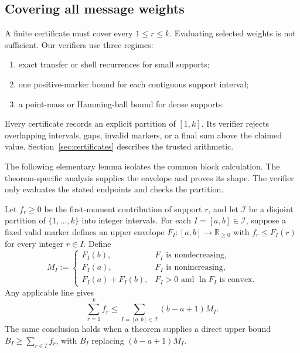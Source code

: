\subsection{Covering all message weights}

A finite certificate must cover every $1\leq r\leq k$.  Evaluating selected
weights is not sufficient.  Our verifiers use three regimes:

\begin{enumerate}
  \item exact transfer or shell recurrences for small supports;
  \item one positive-marker bound for each contiguous support interval;
  \item a point-mass or Hamming-ball bound for dense supports.
\end{enumerate}

Every certificate records an explicit partition of $[1,k]$.  Its verifier
rejects overlapping intervals, gaps, invalid markers, or a final sum above the
claimed value.  Section~\ref{sec:certificates} describes the trusted
arithmetic.

The following elementary lemma isolates the common block calculation.  The
theorem-specific analysis supplies the envelope and proves its shape.  The
verifier only evaluates the stated endpoints and checks the partition.

\begin{lemma}
\label{lem:certified-support-partition}
Let $f_r\geq0$ be the first-moment contribution of support $r$, and let
$\mathcal I$ be a disjoint partition of $\{1,\ldots,k\}$ into integer
intervals.  For each $I=[a,b]\in\mathcal I$, suppose a fixed valid marker
defines an upper envelope $F_I:[a,b]\to\mathbb R_{\geq0}$ with
$f_r\leq F_I(r)$ for every integer $r\in I$.  Define
\begin{equation}
 M_I:=
 \begin{cases}
  F_I(b),&F_I\text{ is nondecreasing},\\
  F_I(a),&F_I\text{ is nonincreasing},\\
  F_I(a)+F_I(b),&F_I>0\text{ and }\ln F_I\text{ is convex}.
 \end{cases}
 \label{eq:certified-block-endpoint}
\end{equation}
Any applicable line gives
\begin{equation}
 \sum_{r=1}^{k}f_r
 \leq\sum_{I=[a,b]\in\mathcal I}(b-a+1)M_I.
 \label{eq:certified-partition-sum}
\end{equation}
The same conclusion holds when a theorem supplies a direct upper bound
$B_I\geq\sum_{r\in I}f_r$, with $B_I$ replacing $(b-a+1)M_I$.
\end{lemma}

